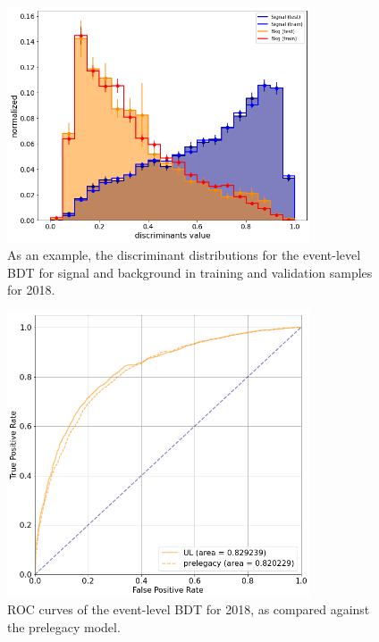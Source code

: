 \documentclass[twoside]{article}
\begin{document}
\begin{figure}[h!]
    \centering
    \includegraphics[width=0.8\textwidth]{plots/evtbdt/evtbdt_dist.png} 
    \caption{As an example, the discriminant distributions for the event-level BDT for signal and background in training and validation samples for 2018.}
    \label{fig:evtbdt_dist} 
\end{figure}

\begin{figure}[h!]
    \centering
    \includegraphics[width=0.8\textwidth]{plots/evtbdt/evtbdt_roc.png} 
    \caption{ROC curves of the event-level BDT for 2018, as compared against the prelegacy model.}
    \label{fig:evtbdt_roc} 
\end{figure}
\end{document}
